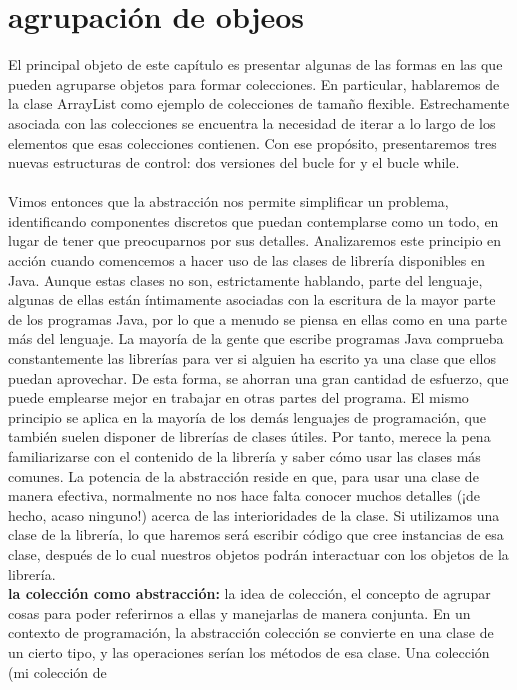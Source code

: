 \documentclass[11pt,a4paper]{article}
\begin{document}
	\section{agrupación de objeos}
	El principal objeto de este capítulo es presentar algunas de las formas en las que pueden agruparse
	objetos para formar colecciones. En particular, hablaremos de la clase ArrayList como ejemplo
	de colecciones de tamaño flexible. Estrechamente asociada con las colecciones se encuentra la
	necesidad de iterar a lo largo de los elementos que esas colecciones contienen. Con ese propósito,
	presentaremos tres nuevas estructuras de control: dos versiones del bucle for y el bucle while.\\
	\\
	Vimos entonces
	que la abstracción nos permite simplificar un problema, identificando componentes discretos que
	puedan contemplarse como un todo, en lugar de tener que preocuparnos por sus detalles. Analizaremos
	este principio en acción cuando comencemos a hacer uso de las clases de librería disponibles
	en Java. Aunque estas clases no son, estrictamente hablando, parte del lenguaje, algunas de
	ellas están íntimamente asociadas con la escritura de la mayor parte de los programas Java, por lo
	que a menudo se piensa en ellas como en una parte más del lenguaje. La mayoría de la gente que
	escribe programas Java comprueba constantemente las librerías para ver si alguien ha escrito ya
	una clase que ellos puedan aprovechar. De esta forma, se ahorran una gran cantidad de esfuerzo,
	que puede emplearse mejor en trabajar en otras partes del programa. El mismo principio se aplica en la mayoría de los demás lenguajes de programación, que también suelen disponer de librerías
	de clases útiles. Por tanto, merece la pena familiarizarse con el contenido de la librería y saber
	cómo usar las clases más comunes. La potencia de la abstracción reside en que, para usar una clase
	de manera efectiva, normalmente no nos hace falta conocer muchos detalles (¡de hecho, acaso
	ninguno!) acerca de las interioridades de la clase.
	Si utilizamos una clase de la librería, lo que haremos será escribir código que cree instancias de
	esa clase, después de lo cual nuestros objetos podrán interactuar con los objetos de la librería.\\
	\textbf{la colección como abstracción:} la idea de colección, el concepto
	de agrupar cosas para poder referirnos a ellas y manejarlas de manera conjunta. En un contexto de programación, la abstracción colección se convierte en una clase de un
	cierto tipo, y las operaciones serían los métodos de esa clase. Una colección (mi colección de
\end{document}

